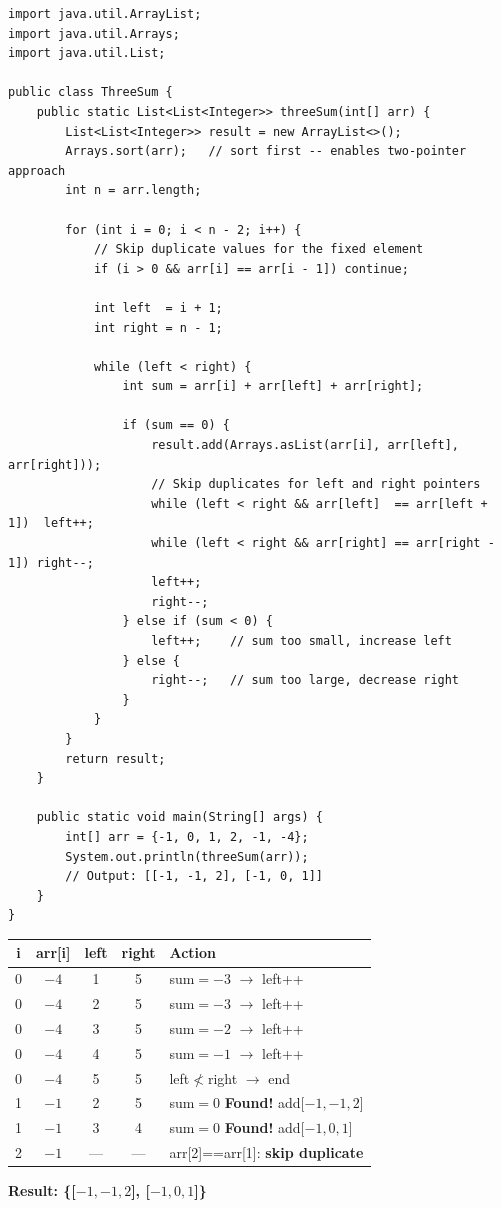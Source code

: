 \documentclass[12pt,a4paper,oneside]{book}
\begin{document}
\begin{lstlisting}[caption={3-Sum --- Sort + Two Pointer, O(n$^2$)}]
import java.util.ArrayList;
import java.util.Arrays;
import java.util.List;

public class ThreeSum {
    public static List<List<Integer>> threeSum(int[] arr) {
        List<List<Integer>> result = new ArrayList<>();
        Arrays.sort(arr);   // sort first -- enables two-pointer approach
        int n = arr.length;

        for (int i = 0; i < n - 2; i++) {
            // Skip duplicate values for the fixed element
            if (i > 0 && arr[i] == arr[i - 1]) continue;

            int left  = i + 1;
            int right = n - 1;

            while (left < right) {
                int sum = arr[i] + arr[left] + arr[right];

                if (sum == 0) {
                    result.add(Arrays.asList(arr[i], arr[left], arr[right]));
                    // Skip duplicates for left and right pointers
                    while (left < right && arr[left]  == arr[left + 1])  left++;
                    while (left < right && arr[right] == arr[right - 1]) right--;
                    left++;
                    right--;
                } else if (sum < 0) {
                    left++;    // sum too small, increase left
                } else {
                    right--;   // sum too large, decrease right
                }
            }
        }
        return result;
    }

    public static void main(String[] args) {
        int[] arr = {-1, 0, 1, 2, -1, -4};
        System.out.println(threeSum(arr));
        // Output: [[-1, -1, 2], [-1, 0, 1]]
    }
}
\end{lstlisting}

\begin{dryrun}[Dry Run: arr after sort = \{$-4,-1,-1,0,1,2$\}]
\begin{center}
\begin{tabular}{ccccp{4.5cm}}
\toprule
\textbf{i} & \textbf{arr[i]} & \textbf{left} & \textbf{right} & \textbf{Action}\\
\midrule
0 & $-4$ & 1 & 5 & sum$=-3$ $\to$ left++\\
0 & $-4$ & 2 & 5 & sum$=-3$ $\to$ left++\\
0 & $-4$ & 3 & 5 & sum$=-2$ $\to$ left++\\
0 & $-4$ & 4 & 5 & sum$=-1$ $\to$ left++\\
0 & $-4$ & 5 & 5 & left$\not<$right $\to$ end\\
\midrule
1 & $-1$ & 2 & 5 & sum$=0$ \textbf{Found!} add[$-1,-1,2$]\\
1 & $-1$ & 3 & 4 & sum$=0$ \textbf{Found!} add[$-1,0,1$]\\
\midrule
2 & $-1$ & --- & --- & arr[2]==arr[1]: \textbf{skip duplicate}\\
\bottomrule
\end{tabular}
\end{center}
\textbf{Result: \{[$-1,-1,2$], [$-1,0,1$]\}}
\end{dryrun}
\end{document}
